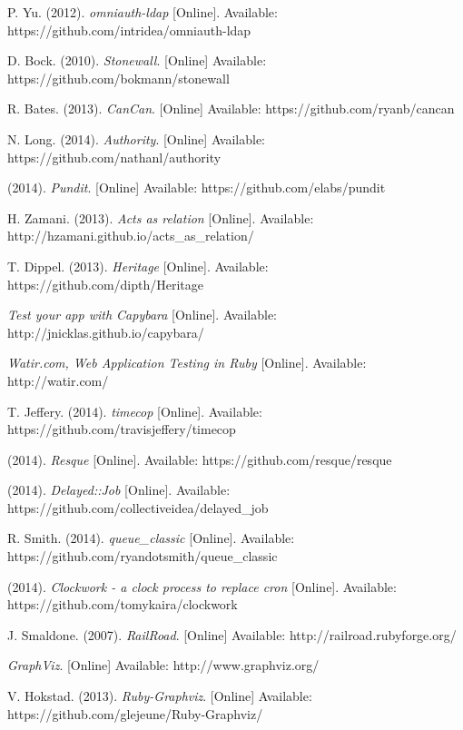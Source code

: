 \begin{thebibliography}{99}
P. Yu. (2012). \textit{omniauth-ldap} [Online]. Available: https://github.com/intridea/omniauth-ldap

D. Bock. (2010). \textit{Stonewall}. [Online] Available: https://github.com/bokmann/stonewall

R. Bates. (2013). \textit{CanCan}. [Online] Available: https://github.com/ryanb/cancan

N. Long. (2014). \textit{Authority}. [Online] Available: https://github.com/nathanl/authority

(2014). \textit{Pundit}. [Online] Available: https://github.com/elabs/pundit

H. Zamani. (2013). \textit{Acts as relation} [Online]. Available: http://hzamani.github.io/acts\_as\_relation/

T. Dippel. (2013). \textit{Heritage} [Online]. Available: https://github.com/dipth/Heritage

\textit{Test your app with Capybara} [Online]. Available: http://jnicklas.github.io/capybara/

\textit{Watir.com, Web Application Testing in Ruby} [Online]. Available: http://watir.com/

T. Jeffery. (2014). \textit{timecop} [Online]. Available: https://github.com/travisjeffery/timecop

(2014). \textit{Resque} [Online]. Available: https://github.com/resque/resque

(2014). \textit{Delayed::Job} [Online]. Available: https://github.com/collectiveidea/delayed\_job

R. Smith. (2014). \textit{queue\_classic} [Online]. Available: https://github.com/ryandotsmith/queue\_classic

(2014). \textit{Clockwork - a clock process to replace cron} [Online]. Available: https://github.com/tomykaira/clockwork

J. Smaldone. (2007). \textit{RailRoad}. [Online] Available: http://railroad.rubyforge.org/

\textit{GraphViz}. [Online] Available: http://www.graphviz.org/

V. Hokstad. (2013). \textit{Ruby-Graphviz}. [Online] Available: https://github.com/glejeune/Ruby-Graphviz/


\end{thebibliography}
